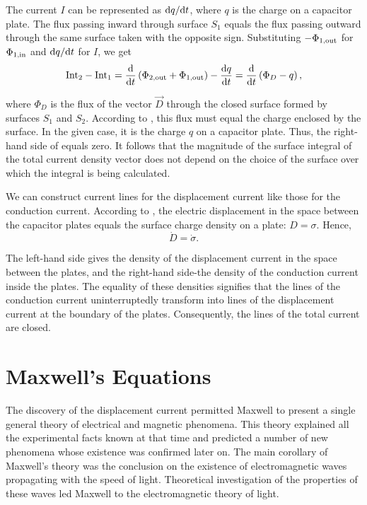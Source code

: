 \noindent
The current $I$ can be represented as $\mathrm{d} q/\mathrm{d} t$, where $q$ is the charge on a capacitor plate.
The flux passing inward through surface $S_1$ equals
the flux passing outward through the same surface taken with the opposite sign.
Substituting $-\Phi_{\text{$1$,out}}$ for $\Phi_{\text{$1$,in}}$ and $\mathrm{d} q/\mathrm{d} t$ for $I$, we get
\begin{equation}\label{eq:9_14}
    \text{Int}_2 - \text{Int}_1 = \dfrac{\mathrm{d}}{\mathrm{d} t} \left(\Phi_{\text{$2$,out}} + \Phi_{\text{$1$,out}}\right) - \dfrac{\mathrm{d} q}{\mathrm{d} t} = \dfrac{\mathrm{d}}{\mathrm{d} t} \left(\Phi_D - q\right),
\end{equation}

\noindent
where $\Phi_D$ is the flux of the vector $\vec{D}$ through the closed surface formed by surfaces $S_1$ and $S_2$.
According to , this flux must equal the charge enclosed by the surface.
In the given case, it is the charge $q$ on a capacitor plate.
Thus, the right-hand side of  equals zero.
It follows that the magnitude of the surface integral of the total current density vector does not depend on the choice of the surface over which the integral is being calculated.

We can construct current lines for the displacement current like those for the conduction current.
According to , the electric displacement in the space between the capacitor plates equals the surface charge density on a plate: $D=\sigma$.
Hence,
\begin{equation*}
    \dot{D} = \dot{\sigma}.
\end{equation*}

\noindent
The left-hand side gives the density of the displacement current in the space between the plates, and the right-hand side-the density of the conduction current inside the plates.
The equality of these densities signifies that the lines of the conduction current uninterruptedly transform into lines of the displacement current at the boundary of the plates.
Consequently, the lines of the total current are closed.

\section{Maxwell's Equations}\label{sec:9_3}

The discovery of the displacement current permitted Maxwell to present a single general theory of electrical and magnetic phenomena.
This theory explained all the experimental facts known at that time and predicted a number of new phenomena whose existence was confirmed later on.
The main corollary of Maxwell's theory was the conclusion on the existence of electromagnetic waves propagating with the speed of light.
Theoretical investigation of the properties of these waves led Maxwell to the electromagnetic theory of light.

